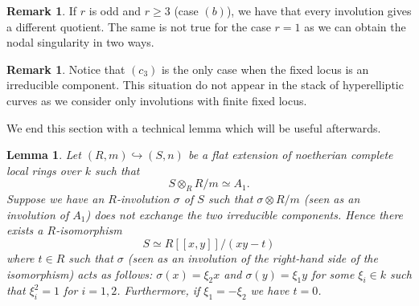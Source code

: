 \documentclass{alggeom}
\numberwithin{equation}{section}
\numberwithin{subsection}{section}
\newtheorem{lemma}[theorem]{Lemma}
\theoremstyle{definition}
\newtheorem{remark}[theorem]{Remark}
\theoremstyle{remark}
\begin{document}
\begin{remark}
	If $r$ is odd and $r\geq 3$ (case $(b)$), we have that every involution gives a different quotient. The same is not true for the case $r=1$ as we can obtain the nodal singularity in two ways.
\end{remark}

\begin{remark}\label{rem:fix-locus}
 Notice that $(c_3)$ is the only case when the fixed locus is an irreducible component. This situation do not appear in the stack of hyperelliptic curves as we consider only involutions with finite fixed locus. 
\end{remark}
 
 We end this section with a technical lemma which will be useful afterwards. 
 \begin{lemma}\label{lem:local-node-involution}
 	Let $(R,m)\hookrightarrow (S,n)$ be a flat extension of noetherian complete local rings over $k$ such that  $$S\otimes_R R/m \simeq A_1.$$
 	Suppose we have an $R$-involution $\sigma$ of $S$ such that $\sigma \otimes R/m$ (seen as an involution of $A_1$) does not exchange the two irreducible components. Hence there exists a $R$-isomorphism 
 	$$ S \simeq R[[x,y]]/(xy-t) $$
 	where $t \in R$ such that $\sigma$ (seen as an involution of the right-hand side of the isomorphism) acts as follows: $\sigma(x)=\xi_2x$ and $\sigma(y)=\xi_1y$ for some $\xi_i \in k$ such that $\xi_i^2=1$ for $i=1,2$. Furthermore, if $\xi_1=-\xi_2$ we have $t=0$.

 \end{lemma}
\end{document}
